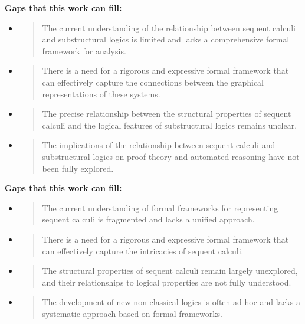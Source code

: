 \textbf{Gaps that this work can fill:}

\begin{itemize}
\item
  \begin{quote}
  The current understanding of the relationship between sequent calculi
  and substructural logics is limited and lacks a comprehensive formal
  framework for analysis.
  \end{quote}
\item
  \begin{quote}
  There is a need for a rigorous and expressive formal framework that
  can effectively capture the connections between the graphical
  representations of these systems.
  \end{quote}
\item
  \begin{quote}
  The precise relationship between the structural properties of sequent
  calculi and the logical features of substructural logics remains
  unclear.
  \end{quote}
\item
  \begin{quote}
  The implications of the relationship between sequent calculi and
  substructural logics on proof theory and automated reasoning have not
  been fully explored.
  \end{quote}
\end{itemize}

\textbf{Gaps that this work can fill:}

\begin{itemize}
\item
  \begin{quote}
  The current understanding of formal frameworks for representing
  sequent calculi is fragmented and lacks a unified approach.
  \end{quote}
\item
  \begin{quote}
  There is a need for a rigorous and expressive formal framework that
  can effectively capture the intricacies of sequent calculi.
  \end{quote}
\item
  \begin{quote}
  The structural properties of sequent calculi remain largely
  unexplored, and their relationships to logical properties are not
  fully understood.
  \end{quote}
\item
  \begin{quote}
  The development of new non-classical logics is often ad hoc and lacks
  a systematic approach based on formal frameworks.
  \end{quote}
\end{itemize}


